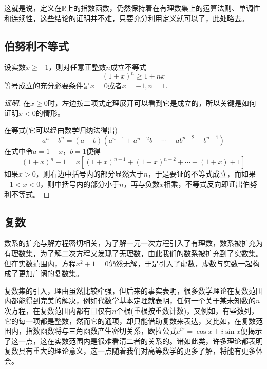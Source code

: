 这就是说，定义在$\mathbb{R}$上的指数函数，仍然保持着在有理数集上的运算法则、单调性和连续性，这些结论的证明并不难，只要充分利用定义就可以了，此处略去。

\subsection{伯努利不等式}
\label{sec:bernoulli-inequality}

\begin{theorem}
  \label{theorem:bernoulli-inequality}
  设实数$x \geqslant -1$，则对任意正整数$n$成立不等式
  \begin{equation}
    \label{eq:bernoulli-inequality}
   (1+x)^n \geqslant 1+nx 
 \end{equation}
 等号成立的充分必要条件是$x=0$或者$x=-1,n=1$.
\end{theorem}

\begin{proof}[证明]
  在$x \geqslant 0$时，左边按二项式定理展开可以看到它是成立的，所以关键是如何证明$x<0$的情形。

  在等式(它可以经由数学归纳法得出)
  \[ a^n-b^n = (a-b)(a^{n-1}+a^{n-2}b+\cdots+ab^{n-2}+b^{n-1}) \]
  在式中令$a=1+x$，$b=1$便得
  \[ (1+x)^n-1=x \left[ (1+x)^{n-1}+(1+x)^{n-2}+\cdots+(1+x)+1 \right] \]
  如果$x>0$，则右边中括号内的部分显然大于$n$，于是要证的不等式成立，而如果$-1<x<0$，则中括号内的部分小于$n$，再与负数$x$相乘，不等式反向即证出伯努利不等式。
\end{proof}

\subsection{复数}
\label{sec:complex-number}

数系的扩充与解方程密切相关，为了解一元一次方程引入了有理数，数系被扩充为有理数集，为了解二次方程又发现了无理数，由此我们的数系被扩充到了实数集。但在实数范围内，方程$x^2+1=0$仍然无解，于是引入了虚数，虚数与实数一起构成了更加广阔的复数集。

复数集的引入，理由虽然比较牵强，但后来的事实表明，很多数学理论在复数范围内都能得到完美的解决，例如代数学基本定理就表明，任何一个关于某未知数的$n$次方程，在复数范围内都有且仅有$n$个根(重根按重数计数)，又例如，有些数列，它的每一项都是整数，然而它的通项，却只能借助复数来表达，又比如，在复数范围内，指数函数将与三角函数产生密切关系，欧拉公式$e^{ix}=\cos{x}+i\sin{x}$便揭示了这一点，这在实数范围内是很难看清二者的关系的。诸如此类，许多理论都表明复数具有重大的理论意义，这一点随着我们对高等数学的更多了解，将能有更多体会。

